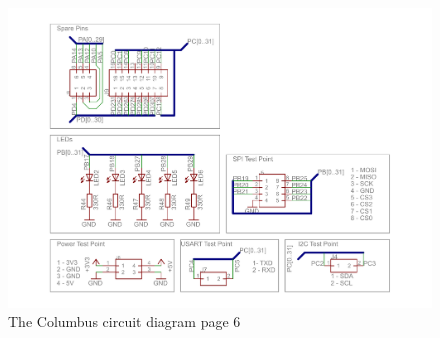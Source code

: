 \begin{figure}[ht!]
\centering
\includegraphics[angle = 90, width=\textwidth,height=\textheight,keepaspectratio]{./Figures/ColumbusCircuitPage6.pdf}
\caption{The Columbus circuit diagram page 6}
\label{sch:Columbus_Schematic:6}
\end{figure}

